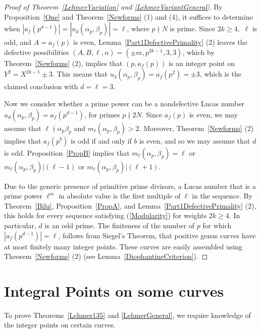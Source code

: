 \documentclass[12pt]{amsart}
\newcommand{\?}{\color{red}?}
\numberwithin{equation}{section}
\begin{document}
\begin{proof}[Proof of Theorem~\ref{LehmerVariation} and \ref{LehmerVariantGeneral}]
By Proposition~\ref{One} and Theorem~\ref{Newforms} (1) and (4), it suffices to determine when
$|a_f(p^{d-1})|=|u_{d}(\alpha_p,\beta_p)|=\ell$, where $p\nmid N$ is prime. Since  $2k\geq 4,$
$\ell$ is odd, and $A=a_f(p)$ is even, Lemma~\ref{Part1DefectivePrimality} (2) leaves the defective possibilities
 $(A,B,\ell,n)=(\pm m,p^{2k-1},3,3)$, which by Theorem~\ref{Newforms} (2), implies that $(p,a_f(p))$ is an integer point on
$Y^2=X^{2k-1}\pm 3.$
This means that $u_3(\alpha_p,\beta_p)=a_f(p^2)=\pm 3$, which 
is the claimed conclusion with $d=\ell=3$.

Now we consider whether a prime power can be
a nondefective Lucas number $u_{d}(\alpha_p,\beta_p)=a_f(p^{d-1})$, for primes $p\nmid 2N$.
Since $a_f(p)$ is even, we may assume that $\ell \nmid \alpha_p \beta_p$ and $m_{\ell}(\alpha_p,\beta_p)>2$. Moreover, Theorem~\ref{Newforms} (2) implies
that $a_f(p^b)$ is odd if and only if $b$ is even, and so we may assume that $d$ is odd.
Proposition~\ref{PropB} implies that $m_{\ell}(\alpha_p,\beta_p)=\ell$ or $m_{\ell}(\alpha_p,\beta_p) | (\ell-1)$ or
$m_{\ell}(\alpha_p,\beta_p) | (\ell+1)$.

Due to the generic presence of primitive prime divisors, a Lucas number that is a prime power $\ell^m$ in absolute
value is the first multiple of $\ell$ in the sequence.
By Theorem~\ref{Bilu}, Proposition~\ref{PropA}, and Lemma~\ref{Part1DefectivePrimality} (2), this
holds for every sequence satisfying (\ref{Modularity}) for weights $2k\geq 4$.
In particular, $d$ is an odd prime. 
The finiteness of the number of $p$ for which $|a_f(p^{d-1})|=\ell$, follows from Siegel's Theorem, that positive genus curves  have at most finitely many integer points. These curves are easily assembled using Theorem~\ref{Newforms} (2) (see Lemma~\ref{DiophantineCriterion}).
\end{proof}





\section{Integral Points on some curves}\label{IntegerPoints}
To prove Theorems~\ref{Lehmer135} and \ref{LehmerGeneral}, we require knowledge of the integer points on certain curves.
\end{document}

